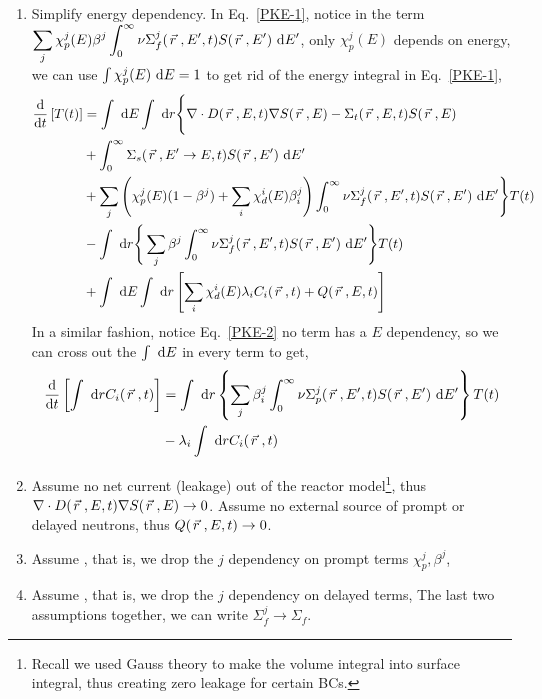 \documentclass{school-22.211-notes}
\begin{document}
\begin{enumerate}
\item Simplify energy dependency. In Eq.~\ref{PKE-1}, notice in the term $\displaystyle\sum_j \chi_p^j (E) \beta^j \int_0^{\infty} \nu \Sigma_f^j (\left.\vec{r}\right., E', t) S(\left.\vec{r}\right., E') \mbox{ }\mathrm{d} E'$, only $\chi_p^j(E)$ depends on energy, we can use $\int \chi_p^j (E) \mbox{ }\mathrm{d} E = 1$ to get rid of the energy integral in Eq.~\ref{PKE-1}, 
  \begin{align}
    \frac{\mathrm{d}}{\mathrm{d}t} \left[ T(t) \right] &= 
    \int \mbox{ }\mathrm{d} E \int \mbox{ }\mathrm{d} r \Bigg\{ \nabla \cdot D(\left.\vec{r}\right., E, t) \nabla S(\left.\vec{r}\right., E) - \Sigma_t (\left.\vec{r}\right., E, t) S(\left.\vec{r}\right., E)   \notag \\
    & + \int_0^{\infty} \Sigma_s (\left.\vec{r}\right., E'\to E, t) S(\left.\vec{r}\right., E') \mbox{ }\mathrm{d} E'   \notag \\
    &+ \displaystyle\sum_j \left( \chi_p^j (E) (1-\beta^j) + \displaystyle\sum_i \chi_d^i (E) \beta_i^j \right) \int_0^{\infty} \nu \Sigma_f^j (\left.\vec{r}\right., E', t) S(\left.\vec{r}\right., E') \mbox{ }\mathrm{d} E'  \Bigg\} T(t)  \notag \\
    &- \int \mbox{ }\mathrm{d} r \Bigg\{ \displaystyle\sum_j \beta^j \int_0^{\infty} \nu \Sigma_f^j (\left.\vec{r}\right., E', t) S(\left.\vec{r}\right., E') \mbox{ }\mathrm{d} E' \Bigg\} T(t)  \notag \\
    &+ \int \mbox{ }\mathrm{d} E \int \mbox{ }\mathrm{d} r \left[ \displaystyle\sum_i \chi_d^i (E) \lambda_i C_i (\left.\vec{r}\right., t) + Q(\left.\vec{r}\right., E, t)\right]   \label{PKE-3}
  \end{align}
  In a similar fashion, notice Eq.~\ref{PKE-2} no term has a $E$ dependency, so we can cross out the $\int \mbox{ }\mathrm{d} E$ in every term to get, 
    \begin{align}
    \frac{\mathrm{d}}{\mathrm{d}t} \left[ \int \mbox{ }\mathrm{d} r C_i (\left.\vec{r}\right., t) \right] &= \int \mbox{ }\mathrm{d} r \left\{ \displaystyle\sum_j \beta_i^j \int_0^{\infty} \nu \Sigma_p^j (\left.\vec{r}\right., E', t) S(\left.\vec{r}\right., E') \mbox{ }\mathrm{d} E' \right\} T(t) \notag \\
    &- \lambda_i \int \mbox{ }\mathrm{d} r C_i (\left.\vec{r}\right., t)  \label{PKE-4}
  \end{align}


\item Assume no net current (leakage) out of the reactor model\footnote{Recall we used Gauss theory to make the volume integral into surface integral, thus creating zero leakage for certain BCs.}, thus $\nabla \cdot D(\left.\vec{r}\right., E, t) \nabla S(\left.\vec{r}\right., E) \to 0$. Assume no external source of prompt or delayed neutrons, thus $Q(\left.\vec{r}\right., E, t) \to 0$. 


\item Assume , that is, we drop the $j$ dependency on prompt terms $\chi_p^j, \beta^j$, 

\item Assume , that is, we drop the $j$ dependency on delayed terms, 
The last two assumptions together, we can write $\Sigma_f^j \to \Sigma_f$. 


\end{enumerate}
\end{document}
